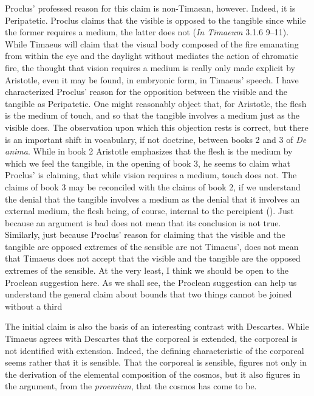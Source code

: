 Proclus' professed reason for this claim is non-Timaean, however. Indeed, it is Peripatetic. Proclus claims that the visible is opposed to the tangible since while the former requires a medium, the latter does not (\emph{In Timaeum} 3.1.6 9--11). While Timaeus will claim that the visual body composed of the fire emanating from within the eye and the daylight without mediates the action of chromatic fire, the thought that vision requires a medium is really only made explicit by Aristotle, even it may be found, in embryonic form, in Timaeus' speech. I have characterized Proclus' reason for the opposition between the visible and the tangible as Peripatetic. One might reasonably object that, for Aristotle, the flesh is the medium of touch, and so that the tangible involves a medium just as the visible does. The observation upon which this objection rests is correct, but there is an important shift in vocabulary, if not doctrine, between books 2 and 3 of \emph{De anima}. While in book 2 Aristotle emphasizes that the flesh is the medium by which we feel the tangible, in the opening of book 3, he seems to claim what Proclus' is claiming, that while vision requires a medium, touch does not. The claims of book 3 may be reconciled with the claims of book 2, if we understand the denial that the tangible involves a medium as the denial that it involves an external medium, the flesh being, of course, internal to the percipient (\citealt[chapter 2.1.3]{Kalderon:2015fr}). Just because an argument is bad does not mean that its conclusion is not true. Similarly, just because Proclus' reason for claiming that the visible and the tangible are opposed extremes of the sensible are not Timaeus', does not mean that Timaeus does not accept that the visible and the tangible are the opposed extremes of the sensible. At the very least, I think we should be open to the Proclean suggestion here. As we shall see, the Proclean suggestion can help us understand the general claim about bounds that two things cannot be joined without a third

The initial claim is also the basis of an interesting contrast with Descartes. While Timaeus agrees with Descartes that the corporeal is extended, the corporeal is not identified with extension. Indeed, the defining characteristic of the corporeal seems rather that it is sensible. That the corporeal is sensible, figures not only in the derivation of the elemental composition of the cosmos, but it also figures in the argument, from the \emph{proemium}, that the cosmos has come to be.

